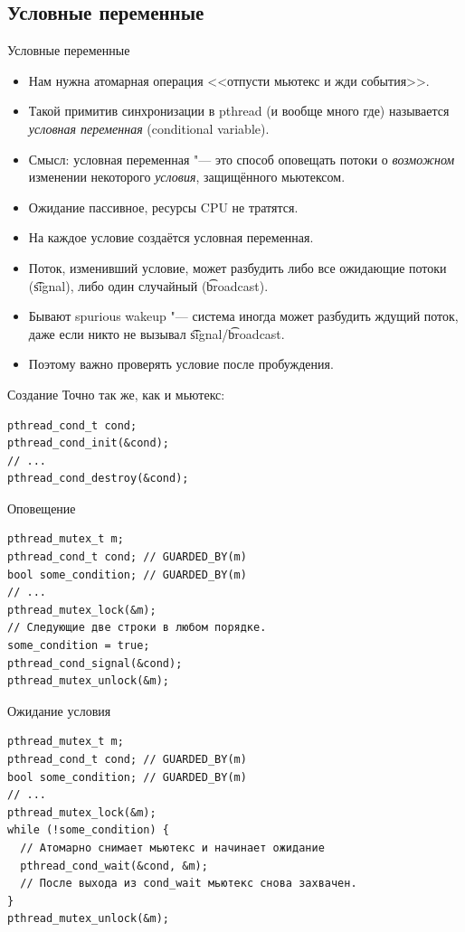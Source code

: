 \subsection{Условные переменные}

\begin{frame}{Условные переменные}
	\begin{itemize}
		\item Нам нужна атомарная операция <<отпусти мьютекс и жди события>>.
		\item Такой примитив синхронизации в pthread (и вообще много где) называется \textit{условная переменная} (conditional variable).
		\item Смысл: условная переменная "--- это способ оповещать потоки о \textit{возможном} изменении некоторого \textit{условия}, защищённого мьютексом.
		\item Ожидание пассивное, ресурсы CPU не тратятся.
		\item На каждое условие создаётся условная переменная.
		\item Поток, изменивший условие, может разбудить либо все ожидающие потоки (\t{signal}), либо один случайный (\t{broadcast}).
		\item Бывают spurious wakeup "--- система иногда может разбудить ждущий поток, даже если никто не вызывал \t{signal}/\t{broadcast}.
		\item Поэтому важно проверять условие после пробуждения.
	\end{itemize}
\end{frame}

\begin{frame}[fragile]{Создание}
	Точно так же, как и мьютекс:
\begin{verbatim}
pthread_cond_t cond;
pthread_cond_init(&cond);
// ...
pthread_cond_destroy(&cond);
\end{verbatim}
\end{frame}

\begin{frame}[fragile]{Оповещение}
\begin{verbatim}
pthread_mutex_t m;
pthread_cond_t cond; // GUARDED_BY(m)
bool some_condition; // GUARDED_BY(m)
// ...
pthread_mutex_lock(&m);
// Следующие две строки в любом порядке.
some_condition = true;
pthread_cond_signal(&cond);
pthread_mutex_unlock(&m);
\end{verbatim}
\end{frame}

\begin{frame}[fragile]{Ожидание условия}
\begin{verbatim}
pthread_mutex_t m;
pthread_cond_t cond; // GUARDED_BY(m)
bool some_condition; // GUARDED_BY(m)
// ...
pthread_mutex_lock(&m);
while (!some_condition) {
  // Атомарно снимает мьютекс и начинает ожидание
  pthread_cond_wait(&cond, &m);
  // После выхода из cond_wait мьютекс снова захвачен.
}
pthread_mutex_unlock(&m);
\end{verbatim}
\end{frame}

